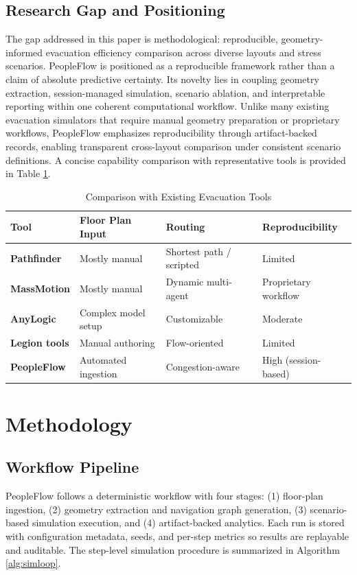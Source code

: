 \documentclass[journal]{IEEEtran}
\begin{document}
\subsection{Research Gap and Positioning}
The gap addressed in this paper is methodological: reproducible, geometry-informed evacuation efficiency comparison across diverse layouts and stress scenarios. PeopleFlow is positioned as a reproducible framework rather than a claim of absolute predictive certainty. Its novelty lies in coupling geometry extraction, session-managed simulation, scenario ablation, and interpretable reporting within one coherent computational workflow.
Unlike many existing evacuation simulators that require manual geometry preparation or proprietary workflows, PeopleFlow emphasizes reproducibility through artifact-backed records, enabling transparent cross-layout comparison under consistent scenario definitions.
A concise capability comparison with representative tools is provided in Table \ref{tab:tool_comparison}.

\begin{table}[t]
\centering
\caption{Comparison with Existing Evacuation Tools}
\label{tab:tool_comparison}
{\footnotesize
\setlength{\tabcolsep}{3pt}
\begin{tabular}{>{\bfseries}p{1.45cm} p{1.55cm} p{2.05cm} p{1.60cm}}
\toprule
Tool & Floor Plan Input & Routing & Reproducibility \\
\midrule
Pathfinder & Mostly manual & Shortest path / scripted & Limited \\
MassMotion & Mostly manual & Dynamic multi-agent & Proprietary workflow \\
AnyLogic & Complex model setup & Customizable & Moderate \\
Legion tools & Manual authoring & Flow-oriented & Limited \\
PeopleFlow & Automated ingestion & Congestion-aware & High (session-based) \\
\bottomrule
\end{tabular}
}
\end{table}

\section{Methodology}
\subsection{Workflow Pipeline}
PeopleFlow follows a deterministic workflow with four stages: (1) floor-plan ingestion, (2) geometry extraction and navigation graph generation, (3) scenario-based simulation execution, and (4) artifact-backed analytics. Each run is stored with configuration metadata, seeds, and per-step metrics so results are replayable and auditable. The step-level simulation procedure is summarized in Algorithm \ref{alg:simloop}.
\end{document}
